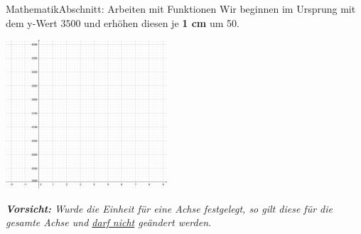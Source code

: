 \documentclass[11pt,twocolumn,oneside,openany,headings=optiontotoc,11pt,numbers=noenddot]{article}
\begin{document}
\begin{worksheet}{}{Mathematik}{Abschnitt: Arbeiten mit Funktionen}
		Wir beginnen im Ursprung mit dem y-Wert \(3500\) und erhöhen diesen je \textbf{1 cm} um 50.\\
		\par\bigskip\noindent
		\includegraphics[width=0.45\textwidth]{../99_Bilder/b2Koord1.jpg}\\
		\par\bigskip\noindent
		\textit{\textbf{Vorsicht:} Wurde die Einheit für eine Achse festgelegt, so gilt diese für die gesamte Achse und \underline{darf nicht} geändert werden.}
	\end{worksheet}
\end{document}
